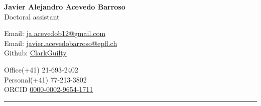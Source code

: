 \documentclass[11pt, a4paper]{article}
\begin{document}
\begin{center}
{\huge \bf Javier Alejandro Acevedo Barroso}\\
{\Large Doctoral assistant}

\end{center}
\begin{minipage}[t]{0.59\textwidth}
  Email: \href{mailto:ja.acevedob12@gmail.com}{ja.acevedob12@gmail.com}\\
  Email: \href{mailto:javier.acevedobarroso@epfl.ch}{javier.acevedobarroso@epfl.ch}\\
  Github: \href{https://github.com/ClarkGuilty}{ClarkGuilty}\\
 
\end{minipage}
\begin{minipage}[t]{0.39\textwidth}
  Office\hfill (+41) 21-693-2402\phantom{00}  \\
  Personal\hfill (+41) 77-213-3802\phantom{00}  \\
  ORCID \hfill \href{https://orcid.org/0000-0002-9654-1711}{0000-0002-9654-1711}
\end{minipage}


\hrule
\end{document}
